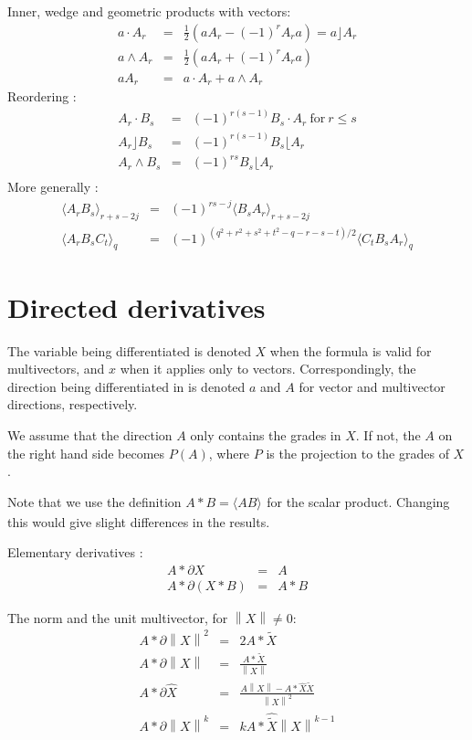 \documentclass[a4paper,12pt]{article}
\newcommand{\grade}[2]{\ensuremath{\langle#2\rangle_{#1}}}
\newcommand{\reverse}[1]{\tilde{#1}} %
\newcommand{\linner}{\ensuremath{\rfloor}}
\newcommand{\rinner}{\ensuremath{\lfloor}}
\providecommand{\norm}[1]{\left\lVert#1\right\rVert}
\providecommand{\normed}[1]{\hat{#1}}
\begin{document}
Inner, wedge and geometric products with vectors\cite{CA2GC}:
\begin{eqnarray}
a\cdot A_r &=& \frac{1}{2}(a A_r - (-1)^r A_r a) = a\linner A_r\\
a\wedge A_r &=& \frac{1}{2}(a A_r + (-1)^r A_r a)\\
a A_r &=& a \cdot A_r + a \wedge A_r
\end{eqnarray}
Reordering \cite{CA2GC, Chisolm:2012aa}:
\begin{eqnarray}
 A_r\cdot B_s &=& (-1)^{r(s-1)} B_s \cdot A_r\ \textrm{for}\ r \leq s\\
 A_r\linner B_s &=& (-1)^{r(s-1)} B_s \rinner A_r\\
 A_r\wedge B_s &=& (-1)^{rs} B_s \rinner A_r\\
\end{eqnarray}
More generally \cite{CA2GC, Chisolm:2012aa}:
\begin{eqnarray}
 \grade{r+s-2j}{A_r B_s} &=& (-1)^{rs - j} \grade{r + s - 2j}{B_s A_r}\\
 \grade{q}{A_r B_s C_t} &=& (-1)^{(q^2 + r^2 + s^2 + t^2 - q - r - s - t)/2} \grade{q}{C_t B_s A_r}
\end{eqnarray}
\section{Directed derivatives}

The variable being differentiated is denoted $X$ when the formula is valid for multivectors, and $x$ when it applies only to vectors. Correspondingly, the direction being differentiated in is denoted $a$ and $A$ for vector and multivector directions, respectively.

We assume that the direction $A$ only contains the grades in $X$. If not, the $A$ on the right hand side becomes $P(A)$, where $P$ is the projection to the grades of $X$.

Note that we use the definition $A * B = \grade{}{A B}$ for the scalar product. Changing this would give slight differences in the results.

Elementary derivatives \cite{HitzerCalculus}:
\begin{eqnarray}
A * \partial  X &=& A\\
A * \partial (X * B)  &=&  A * B
\end{eqnarray}

The norm and the unit multivector, for $\norm{X} \neq 0$:
\begin{eqnarray}
A * \partial \norm{X}^2 &=& 2 A * \reverse{X}\\
A * \partial \norm{X} &=& \frac{A * \reverse{X}}{\norm{X}}\\
A * \partial \normed{X} &=& \frac{A \norm{X} - A * \normed{X} \reverse{X}}{\norm{X}^2}\\
A * \partial \norm{X}^k &=& k A * \normed{\reverse{X}} \norm{X}^{k-1}
\end{eqnarray}
\end{document}
